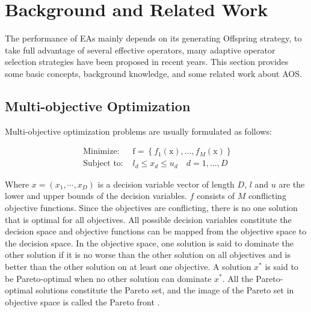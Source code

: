 \documentclass[journal]{IEEEtran}
\begin{document}
\IEEEpubidadjcol

\section{Background and Related Work}
The performance of EAs mainly depends on its generating Offspring strategy, to take full advantage of several effective operators, many adaptive operator selection strategies have been proposed in recent years.
This section provides some basic concepts, background knowledge, and some related work about AOS.

\subsection{Multi-objective Optimization}
Multi-objective optimization problems are usually formulated as follows:

\begin{equation}
  \begin{array}{ll}
    \text { Minimize: }   & \mathrm{f}=\left\{f_{1}(\mathrm{x}), \ldots, f_{M}(\mathrm{x})\right\} \\
    \text { Subject to: } & l_{d} \leq x_{d} \leq u_{d} \quad d=1, \ldots, D
  \end{array}
  \label{eq: moea}
\end{equation}

Where $x = (x_1, \cdots ,x_D)$ is a decision variable vector of length $D$, $l$ and $u$ are the lower and upper bounds of the decision variables. $f$ consists of $M$ conflicting objective functions. Since the objectives are conflicting, there is no one solution that is optimal for all objectives.
All possible decision variables constitute the decision space and objective functions can be mapped from the objective space to the decision space\cite{gonccalves2017adaptive}. In the objective space, one solution is said to dominate the other solution if it is no worse than the other solution on all objectives and is better than the other solution on at least one objective.
A solution $x^*$ is said to be Pareto-optimal when no other solution can dominate $x^*$. All the Pareto-optimal solutions constitute the Pareto set, and the image of the Pareto set in objective space is called the Pareto front \cite{deb2001multi}.
\end{document}

